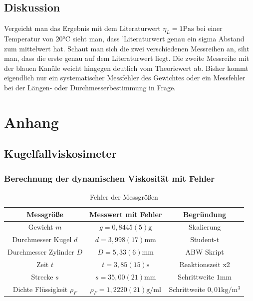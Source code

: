 \documentclass[11pt, a4paper]{article}
\begin{document}
    \subsection{Diskussion}
    Vergeicht man das Ergebnis mit dem Literaturwert $\eta_L = 1 \si{\pascal\second}$ \cite[Abb. 8]{VIS} bei einer Temperatur
    von $20 \si{\celsius}$ sieht man, dass 'Literaturwert genau ein sigma Abstand zum mittelwert hat.
    Schaut man sich die zwei verschiedenen Messreihen an, siht man, dass die erste genau auf dem Literaturwert
    liegt. Die zweite Messreihe mit der blauen Kanüle weicht hingegen deutlich vom Theoriewert ab.
    Bisher kommt eigendlich nur ein systematischer Messfehler des Gewichtes oder ein Messfehler bei der Längen-
    oder Durchmesserbestimmung in Frage. 



    \section{Anhang}
    \subsection{Kugelfallviskosimeter}

    \subsubsection{Berechnung der dynamischen Viskosität mit Fehler} \label{sec:dynvisc}
    
    \begin{table}
       \begin{adjustwidth}{-5cm}{-5cm}
            \centering
            \begin{tabular}{c c c}
                Messgröße & Messwert mit Fehler & Begründung \\ \hline
                
                Gewicht $m$ & $g = 0,8445(5) \si{\gram}$ & Skalierung \\
                Durchmesser Kugel $d$ & $d = 3,998(17) \si{\milli\meter}$ & Student-t \\
                Durchmesser Zylinder $D$ & $D = 5,33(6) \si{\milli\meter}$ & ABW Skript \cite[Tabelle 6]{ABW} \\
                Zeit $t$ & $t = 3,85(15) \si{\second}$ & Reaktionszeit x2\\
                Strecke $s$ & $s = 35,00(21) \si{\milli\metre}$ & Schrittweite $1 \si{\milli\metre}$ \\
                Dichte Flüssigkeit $\rho_F$ & $\rho_F = 1,2220(21)  \si{\gram\per\milli\litre}$ & Schrittweite $0,01 \si{\kilogram\per\cubic\metre}$ \\

            \end{tabular}
        \end{adjustwidth}
        \label{tab:errors}
        \caption[]{Fehler der Messgrößen}
    \end{table}
    
\end{document}

